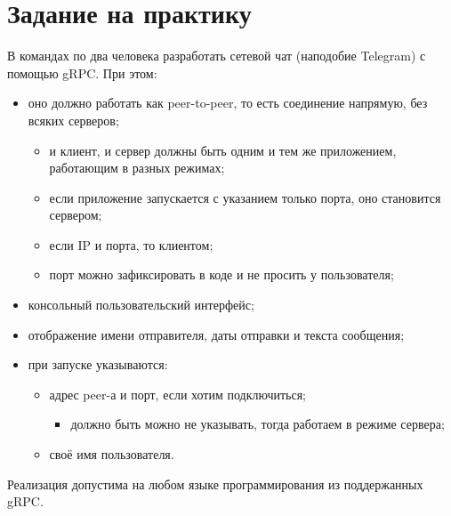 \documentclass{../mcstext}
\begin{document}
\maketitle
\thispagestyle{empty}

\section{Задание на практику}

В командах по два человека разработать сетевой чат (наподобие Telegram) с помощью gRPC. При этом:

\begin{itemize}
    \item оно должно работать как peer-to-peer, то есть соединение напрямую, без всяких серверов;
    \begin{itemize}
        \item и клиент, и сервер должны быть одним и тем же приложением, работающим в разных режимах;
        \item если приложение запускается с указанием только порта, оно становится сервером;
        \item если IP и порта, то клиентом;
        \item порт можно зафиксировать в коде и не просить у пользователя;
    \end{itemize}
    \item консольный пользовательский интерфейс;
    \item отображение имени отправителя, даты отправки и текста сообщения;
    \item при запуске указываются:
    \begin{itemize}
        \item адрес peer-а и порт, если хотим подключиться;
        \begin{itemize}
            \item должно быть можно не указывать, тогда работаем в режиме сервера;
        \end{itemize}
        \item своё имя пользователя.
    \end{itemize}
\end{itemize}

Реализация допустима на любом языке программирования из поддержанных gRPC.
\end{document}

